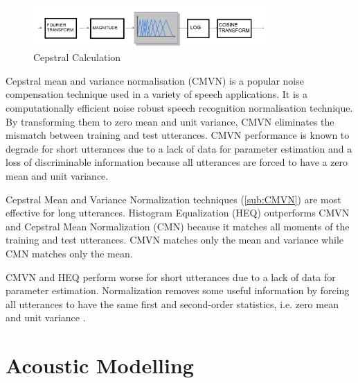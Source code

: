 \begin{figure}[htb]
    \centering
    \includegraphics[width=0.8\textwidth]{img/cepstral.png}
    \caption{Cepstral Calculation}
    \label{fig:cepstral}
\end{figure}

Cepstral mean and variance normalisation (CMVN) is a popular noise compensation technique used in a variety of speech applications. It is a computationally efficient noise robust speech recognition normalisation technique. By transforming them to zero mean and unit variance, CMVN eliminates the mismatch between training and test utterances. CMVN performance is known to degrade for short utterances due to a lack of data for parameter estimation and a loss of discriminable information because all utterances are forced to have a zero mean and unit variance.

Cepstral Mean and Variance Normalization techniques (\ref{sub:CMVN}) are most effective for long utterances. Histogram Equalization (HEQ) outperforms CMVN and Cepstral Mean Normalization (CMN) because it matches all moments of the training and test utterances. CMVN matches only the mean and variance while CMN matches only the mean. 

CMVN and HEQ perform worse for short utterances due to a lack of data for parameter estimation. Normalization removes some useful information by forcing all utterances to have the same first and second-order statistics, i.e. zero mean and unit variance \cite{joshi_modified_2016}.

\section{Acoustic Modelling}
\label{sec:training_the_model}



